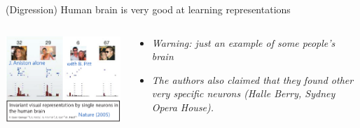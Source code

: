 \documentclass[
  ignorenonframetext,
  aspectratio=169]{beamer}
\begin{document}
\begin{frame}{(Digression) Human brain is very good at learning
representations}
\protect\hypertarget{digression-human-brain-is-very-good-at-learning-representations}{}
\begin{columns}[T]
\begin{column}{.65\textwidth}
\scriptsize

\begin{center}\includegraphics[width=\linewidth]{./Vis/unsupervised/neuron_firing_celebrity} \end{center}

\normalsize
\end{column}

\begin{column}{.3\textwidth}
\begin{itemize}
\item
  \emph{Warning: just an example of some people's brain}
\item
  \emph{The authors also claimed that they found other very specific
  neurons (Halle Berry, Sydney Opera House).}
\end{itemize}
\end{column}
\end{columns}
\end{frame}
\end{document}
